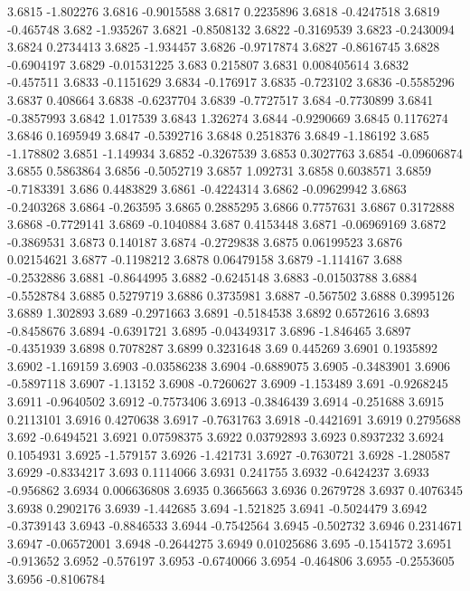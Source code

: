 3.6815  -1.802276
3.6816  -0.9015588
3.6817  0.2235896
3.6818  -0.4247518
3.6819  -0.465748
3.682  -1.935267
3.6821  -0.8508132
3.6822  -0.3169539
3.6823  -0.2430094
3.6824  0.2734413
3.6825  -1.934457
3.6826  -0.9717874
3.6827  -0.8616745
3.6828  -0.6904197
3.6829  -0.01531225
3.683  0.215807
3.6831  0.008405614
3.6832  -0.457511
3.6833  -0.1151629
3.6834  -0.176917
3.6835  -0.723102
3.6836  -0.5585296
3.6837  0.408664
3.6838  -0.6237704
3.6839  -0.7727517
3.684  -0.7730899
3.6841  -0.3857993
3.6842  1.017539
3.6843  1.326274
3.6844  -0.9290669
3.6845  0.1176274
3.6846  0.1695949
3.6847  -0.5392716
3.6848  0.2518376
3.6849  -1.186192
3.685  -1.178802
3.6851  -1.149934
3.6852  -0.3267539
3.6853  0.3027763
3.6854  -0.09606874
3.6855  0.5863864
3.6856  -0.5052719
3.6857  1.092731
3.6858  0.6038571
3.6859  -0.7183391
3.686  0.4483829
3.6861  -0.4224314
3.6862  -0.09629942
3.6863  -0.2403268
3.6864  -0.263595
3.6865  0.2885295
3.6866  0.7757631
3.6867  0.3172888
3.6868  -0.7729141
3.6869  -0.1040884
3.687  0.4153448
3.6871  -0.06969169
3.6872  -0.3869531
3.6873  0.140187
3.6874  -0.2729838
3.6875  0.06199523
3.6876  0.02154621
3.6877  -0.1198212
3.6878  0.06479158
3.6879  -1.114167
3.688  -0.2532886
3.6881  -0.8644995
3.6882  -0.6245148
3.6883  -0.01503788
3.6884  -0.5528784
3.6885  0.5279719
3.6886  0.3735981
3.6887  -0.567502
3.6888  0.3995126
3.6889  1.302893
3.689  -0.2971663
3.6891  -0.5184538
3.6892  0.6572616
3.6893  -0.8458676
3.6894  -0.6391721
3.6895  -0.04349317
3.6896  -1.846465
3.6897  -0.4351939
3.6898  0.7078287
3.6899  0.3231648
3.69  0.445269
3.6901  0.1935892
3.6902  -1.169159
3.6903  -0.03586238
3.6904  -0.6889075
3.6905  -0.3483901
3.6906  -0.5897118
3.6907  -1.13152
3.6908  -0.7260627
3.6909  -1.153489
3.691  -0.9268245
3.6911  -0.9640502
3.6912  -0.7573406
3.6913  -0.3846439
3.6914  -0.251688
3.6915  0.2113101
3.6916  0.4270638
3.6917  -0.7631763
3.6918  -0.4421691
3.6919  0.2795688
3.692  -0.6494521
3.6921  0.07598375
3.6922  0.03792893
3.6923  0.8937232
3.6924  0.1054931
3.6925  -1.579157
3.6926  -1.421731
3.6927  -0.7630721
3.6928  -1.280587
3.6929  -0.8334217
3.693  0.1114066
3.6931  0.241755
3.6932  -0.6424237
3.6933  -0.956862
3.6934  0.006636808
3.6935  0.3665663
3.6936  0.2679728
3.6937  0.4076345
3.6938  0.2902176
3.6939  -1.442685
3.694  -1.521825
3.6941  -0.5024479
3.6942  -0.3739143
3.6943  -0.8846533
3.6944  -0.7542564
3.6945  -0.502732
3.6946  0.2314671
3.6947  -0.06572001
3.6948  -0.2644275
3.6949  0.01025686
3.695  -0.1541572
3.6951  -0.913652
3.6952  -0.576197
3.6953  -0.6740066
3.6954  -0.464806
3.6955  -0.2553605
3.6956  -0.8106784
